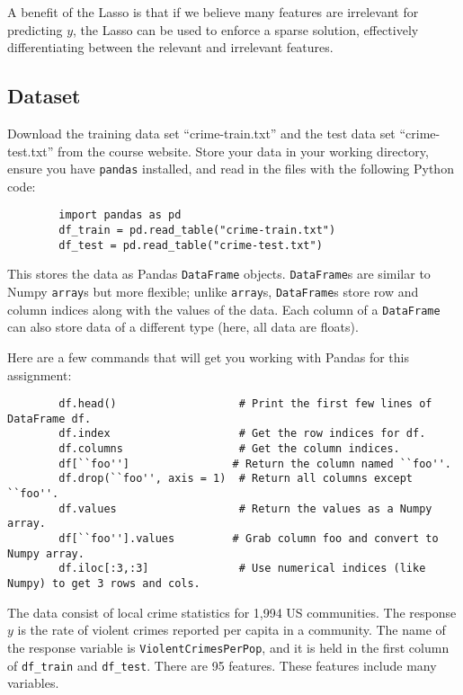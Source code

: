 \documentclass{article}
\begin{document}
    A benefit of the Lasso is that if we believe many features are irrelevant for predicting ${y}$, the Lasso can be used to enforce a sparse solution, effectively differentiating between the relevant and irrelevant features.
    
    \subsection*{Dataset}

    Download the training data set ``crime-train.txt'' and the test data set ``crime-test.txt'' from the course website. Store your data in your working directory, ensure you have \texttt{pandas} installed, and read in the files with the following Python code:
    
    \begin{verbatim}
        import pandas as pd
        df_train = pd.read_table("crime-train.txt")
        df_test = pd.read_table("crime-test.txt")
    \end{verbatim}

    This stores the data as Pandas \texttt{DataFrame} objects. \texttt{DataFrame}s are similar to Numpy \texttt{array}s but more flexible; unlike \texttt{array}s, \texttt{DataFrame}s store row and column indices along with the values of the data. Each column of a \texttt{DataFrame} can also store data of a different type (here, all data are floats). 

    Here are a few commands that will get you working with Pandas for this assignment:

    \begin{verbatim}
        df.head()                   # Print the first few lines of DataFrame df.
        df.index                    # Get the row indices for df.
        df.columns                  # Get the column indices.
        df[``foo'']                # Return the column named ``foo''.
        df.drop(``foo'', axis = 1)  # Return all columns except ``foo''.
        df.values                   # Return the values as a Numpy array.
        df[``foo''].values         # Grab column foo and convert to Numpy array.
        df.iloc[:3,:3]              # Use numerical indices (like Numpy) to get 3 rows and cols.
    \end{verbatim}

    The data consist of local crime statistics for 1,994 US communities. The response $y$ is the rate of violent crimes reported per capita in a community. The name of the response variable is \texttt{ViolentCrimesPerPop}, and it is held in the first column of \texttt{df\_train} and \texttt{df\_test}. There are 95 features. These
    features include many variables.
    
\end{document}
